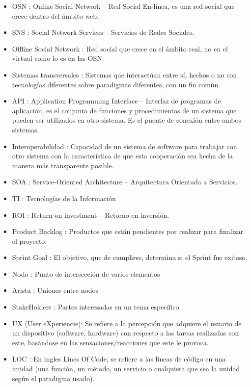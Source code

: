 \begin{itemize}
  \item OSN : Online Social Network – Red Social En-línea, es una red social que crece dentro del ámbito web.
  \item SNS : Social Network Services – Servicios de Redes Sociales.
  \item Offline Social Network : Red social que crece en el ámbito real, no en el virtual como lo es en las OSN.
  \item Sistemas transversales : Sistemas que interactúan entre sí, hechos o no con tecnologías diferentes sobre paradigmas diferentes, con un fin común.
  \item API : Application Programming Interface – Interfaz de programas de aplicación, es el conjunto de funciones y procedimientos de un sistema que pueden ser utilizados en otro sistema. Es el puente de conexión entre ambos sistemas.
  \item Interoperabilidad : Capacidad de un sistema de software para trabajar con otro sistema con la característica de que esta cooperación sea hecha de la manera más transparente posible.
  \item SOA : Service-Oriented Architecture – Arquitectura Orientada a Servicios.
  \item TI : Tecnologías de la Información
  \item ROI : Return on investment – Retorno en inversión.
  \item Product Backlog : Productos que están pendientes por realizar para finalizar el proyecto.
  \item Sprint Goal : El objetivo, que de cumplirse, determina si el Sprint fue exitoso.
  \item Nodo : Punto de intersección de varios elementos
  \item Arista : Uniones entre nodos
  \item StakeHolders : Partes interesadas en un tema específico.
  \item UX (User eXperiencie): Se refiere a la percepción que adquiere el usuario de un dispositivo (software, hardware) con respecto a las tareas realizadas con este, basándose en las sensaciones/reacciones que este le provoca.
  \item LOC : En ingles Lines Of Code, se refiere a las líneas de código en una unidad (una función, un método, un servicio o cualquiera que sea la unidad según el paradigma usado).
\end{itemize}
